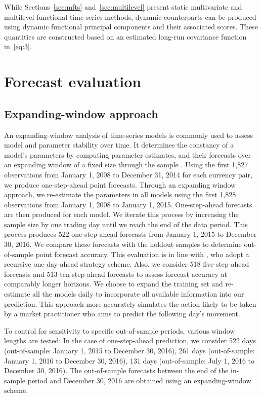 \documentclass[12pt,a4paper]{article}
\begin{document}
While Sections~\ref{sec:mfts} and~\ref{sec:multilevel} present static multivariate and multilevel functional time-series methods, dynamic counterparts can be produced using dynamic functional principal components and their associated scores. These quantities are constructed based on an estimated long-run covariance function in~\eqref{eq:3}.

\section{Forecast evaluation}\label{sec:4}

\subsection{Expanding-window approach}

An expanding-window analysis of time-series models is commonly used to assess model and parameter stability over time. It determines the constancy of a model's parameters by computing parameter estimates, and their forecasts over an expanding window of a fixed size through the sample \citep[see][Chapter 9 for details]{ZW06}. Using the first 1,827 observations from January 1, 2008 to December 31, 2014 for each currency pair, we produce one-step-ahead point forecasts. Through an expanding window approach, we re-estimate the parameters in all models using the first 1,828 observations from January 1, 2008 to January 1, 2015. One-step-ahead forecasts are then produced for each model. We iterate this process by increasing the sample size by one trading day until we reach the end of the data period. This process produces 522 one-step-ahead forecasts from January 1, 2015 to December 30, 2016. We compare these forecasts with the holdout samples to determine out-of-sample point forecast accuracy. This evaluation is in line with \cite{CT10}, who adopt a recursive one-day-ahead strategy scheme. Also, we consider 518 five-step-ahead forecasts and 513 ten-step-ahead forecasts to assess forecast accuracy at comparably longer horizons. We choose to expand the training set and re-estimate all the models daily to incorporate all available information into our prediction. This approach more accurately simulates the action likely to be taken by a market practitioner who aims to predict the following day's movement. 

To control for sensitivity to specific out-of-sample periods, various window lengths are tested: In the case of one-step-ahead prediction, we consider 522 days (out-of-sample: January 1, 2015 to December 30, 2016), 261 days (out-of-sample: January 1, 2016 to December 30, 2016), 131 days (out-of-sample: July 1, 2016 to December 30, 2016). The out-of-sample forecasts between the end of the in-sample period and December 30, 2016 are obtained using an expanding-window scheme.
\end{document}
